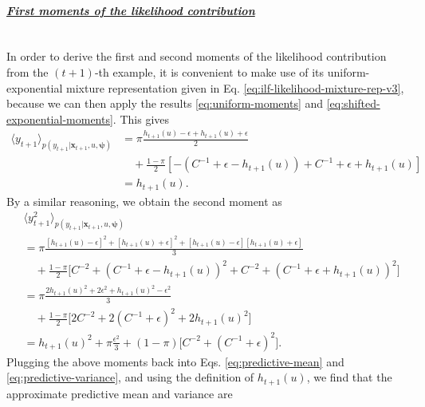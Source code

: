 \paragraph{\underline{\it{First moments of the likelihood contribution}}}
~\\
In order to derive the first and second moments of the likelihood contribution from the $(t+1)$-th example, it is convenient to make use of its uniform-exponential mixture representation given in Eq. \eqref{eq:ilf-likelihood-mixture-rep-v3}, because we can then apply the results \eqref{eq:uniform-moments} and \eqref{eq:shifted-exponential-moments}. This gives
\begin{align}
	\langle y_{t+1} \rangle_{p(y_{t+1}|\mathbf{x}_{t+1}, u, \boldsymbol{\psi})}
	&= \pi\frac{h_{t+1}(u) - \epsilon + h_{t+1}(u) + \epsilon}{2}
	\nonumber \\
	& \quad + \frac{1-\pi}{2}[-(C^{-1} + \epsilon - h_{t+1}(u)) + C^{-1} + \epsilon + h_{t+1}(u)]
	\nonumber \\
	&= h_{t+1}(u).
\end{align}
By a similar reasoning, we obtain the second moment as
\begin{align}
	& \langle y_{t+1}^2 \rangle_{p(y_{t+1}|\mathbf{x}_{t+1}, u, \boldsymbol{\psi})}
	\nonumber \\
	&= \pi\frac{[h_{t+1}(u) - \epsilon]^2 + [h_{t+1}(u) + \epsilon]^2 + [h_{t+1}(u) - \epsilon][h_{t+1}(u) + \epsilon]}{3}
	\nonumber \\
	& \quad + \frac{1-\pi}{2}\big[C^{-2} + (C^{-1} + \epsilon - h_{t+1}(u))^2 + C^{-2} + (C^{-1} + \epsilon + h_{t+1}(u))^2\big]
	\nonumber \\
	&= \pi\frac{2h_{t+1}(u)^2 + 2\epsilon^2 + h_{t+1}(u)^2 - \epsilon^2}{3}
	\nonumber \\
	& \quad + \frac{1-\pi}{2}\big[2C^{-2} + 2(C^{-1} + \epsilon)^2 + 2h_{t+1}(u)^2\big]
	\nonumber \\
	&= h_{t+1}(u)^2 + \pi\frac{\epsilon^2}{3} + (1-\pi)\big[C^{-2} + (C^{-1} + \epsilon)^2\big].
\end{align}
Plugging the above moments back into Eqs. \eqref{eq:predictive-mean} and \eqref{eq:predictive-variance}, and using the definition of $h_{t+1}(u)$, we find that the approximate predictive mean and variance are
